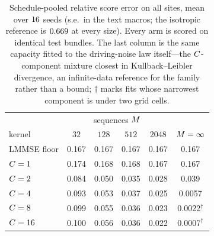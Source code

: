 \begin{table}[t]\setlength{\tabcolsep}{4.5pt}
\centering
\small
\caption{Schedule-pooled relative score error on all sites, mean over $16$ seeds (s.e.\ in the text macros; the isotropic reference is $0.669$ at every size). Every arm is scored on identical test bundles. The last column is the same capacity fitted to the driving-noise law itself---the $C$-component mixture closest in Kullback--Leibler divergence, an infinite-data reference for the family rather than a bound; $\dagger$ marks fits whose narrowest component is under two grid cells.}
\label{tab:capacity}
\begin{tabular}{lcccc|c}
\toprule
& \multicolumn{4}{c|}{sequences $M$} & \\
kernel & $32$ & $128$ & $512$ & $2048$ & $M=\infty$ \\
\midrule
LMMSE floor & 0.167 & 0.167 & 0.167 & 0.167 & 0.167 \\
$C=1$ & 0.174 & 0.168 & 0.168 & 0.167 & 0.167 \\
$C=2$ & 0.084 & 0.050 & 0.035 & 0.028 & 0.039 \\
$C=4$ & 0.093 & 0.053 & 0.037 & 0.025 & 0.0057 \\
$C=8$ & 0.099 & 0.055 & 0.036 & 0.023 & 0.0022$^{\dagger}$ \\
$C=16$ & 0.100 & 0.056 & 0.036 & 0.022 & 0.0007$^{\dagger}$ \\
\bottomrule
\end{tabular}
\end{table}
